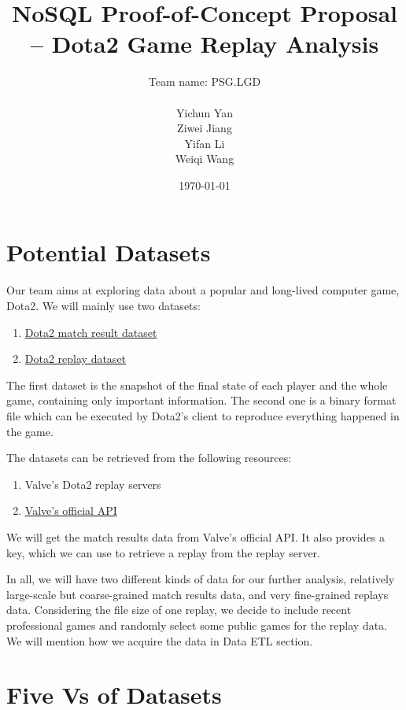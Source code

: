 \documentclass{article}
\title{NoSQL Proof-of-Concept Proposal -- Dota2 Game Replay Analysis}
\author{
	Team name: PSG.LGD \\ \\
	Yichun Yan \\
	Ziwei Jiang \\
	Yifan Li \\
	Weiqi Wang
}
\date{\today}
\begin{document}
\maketitle

\tableofcontents
\clearpage


\section{Potential Datasets}

Our team aims at exploring data about a popular and long-lived computer game, Dota2.
We will mainly use two datasets:

\begin{enumerate}
\item \href{https://wiki.teamfortress.com/wiki/WebAPI/GetMatchDetails}{Dota2 match result dataset}
\item \href{https://wiki.teamfortress.com/wiki/Replay}{Dota2 replay dataset}
\end{enumerate}

The first dataset is the snapshot of the final state of each player and the whole game, containing only important information.
The second one is a binary format file which can be executed by Dota2's client to reproduce everything happened in the game.

The datasets can be retrieved from the following resources:

\begin{enumerate}
\item Valve's Dota2 replay servers
\item \href{https://wiki.teamfortress.com/wiki/WebAPI}{Valve's official API}
\end{enumerate}

We will get the match results data from Valve's official API.
It also provides a key, which we can use to retrieve a replay from the replay server.

In all, we will have two different kinds of data for our further analysis, relatively large-scale but coarse-grained match results data, and very fine-grained replays data.
Considering the file size of one replay, we decide to include recent professional games and randomly select some public games for the replay data.
We will mention how we acquire the data in Data ETL section.

\section{Five Vs of Datasets}
\end{document}
